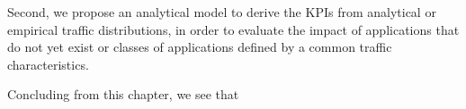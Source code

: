 Second, we propose an analytical model to derive the \glspl{KPI} from analytical or empirical traffic distributions, in order to evaluate the impact of applications that do not yet exist or classes of applications defined by a common traffic characteristics.

Concluding from this chapter, we see that
